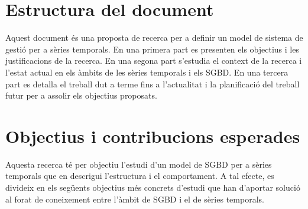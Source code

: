 \section{Estructura del document}

Aquest document és una proposta de recerca per a definir un model de
sistema de gestió per a sèries temporals. En una primera part es
presenten els objectius i les justificacions de la recerca. En una
segona part s'estudia el context de la recerca i l'estat actual en els
àmbits de les sèries temporals i els SGBD. En una tercera part es
detalla el treball dut a terme fins a l'actualitat i la planificació
del treball futur per a assolir els objectius proposats.




\section{Objectius i contribucions esperades}


Aquesta recerca té per objectiu l'estudi d'un model de SGBD per a
sèries temporals que en descrigui l'estructura i el comportament. A
tal efecte, es divideix en els següents objectius més concrets
d'estudi que han d'aportar solució al forat de coneixement entre
l'àmbit de SGBD i el de sèries temporals.


